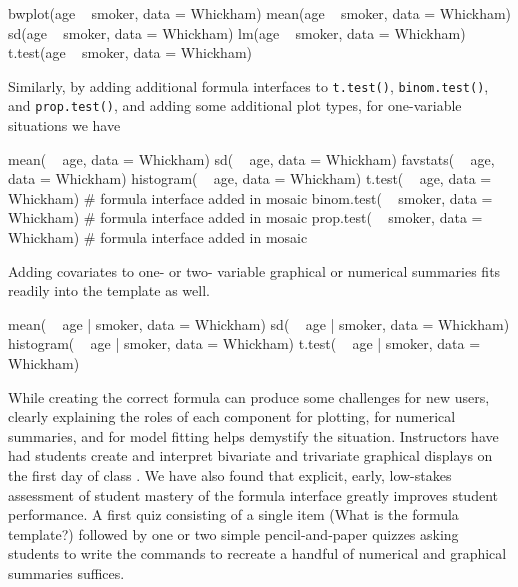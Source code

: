 \begin{Schunk}
\begin{Sinput}
bwplot(age ~ smoker, data = Whickham)
  mean(age ~ smoker, data = Whickham)
    sd(age ~ smoker, data = Whickham)
    lm(age ~ smoker, data = Whickham)
t.test(age ~ smoker, data = Whickham) 
\end{Sinput}
\end{Schunk}

\noindent
Similarly, by adding additional formula interfaces to \texttt{t.test()},
\texttt{binom.test()}, and \texttt{prop.test()}, and adding some
additional plot types, for one-variable situations we have

\begin{Schunk}
\begin{Sinput}
       mean( ~ age, data = Whickham)
         sd( ~ age, data = Whickham)
   favstats( ~ age, data = Whickham)
  histogram( ~ age, data = Whickham)
     t.test( ~ age, data = Whickham)   # formula interface added in mosaic
 binom.test( ~ smoker, data = Whickham)   # formula interface added in mosaic
  prop.test( ~ smoker, data = Whickham)   # formula interface added in mosaic
\end{Sinput}
\end{Schunk}

\noindent
Adding covariates to one- or two- variable graphical or numerical
summaries fits readily into the template as well.

\begin{Schunk}
\begin{Sinput}
     mean( ~ age | smoker, data = Whickham)
       sd( ~ age | smoker, data = Whickham)
histogram( ~ age | smoker, data = Whickham)
   t.test( ~ age | smoker, data = Whickham)
\end{Sinput}
\end{Schunk}

While creating the correct formula can produce some challenges for new
users, clearly explaining the roles of each component for plotting, for
numerical summaries, and for model fitting helps demystify the
situation. Instructors have had students create and interpret bivariate
and trivariate graphical displays on the first day of class
\citep{Wang:USCOTS:2015}. We have also found that explicit, early,
low-stakes assessment of student mastery of the formula interface
greatly improves student performance. A first quiz consisting of a
single item (What is the formula template?) followed by one or two
simple pencil-and-paper quizzes asking students to write the commands to
recreate a handful of numerical and graphical summaries suffices.

